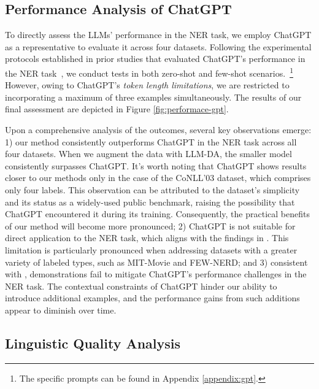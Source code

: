 \documentclass[11pt]{article}
\begin{document}
\subsection{Performance Analysis of ChatGPT}

To directly assess the LLMs' performance in the NER task, we employ ChatGPT as a representative to evaluate it across four datasets. Following the experimental protocols established in prior studies that evaluated ChatGPT's performance in the NER task~\cite{Stanford,GPT-chen, GPT-ye}, we conduct tests in both zero-shot and few-shot scenarios.~\footnote{The specific prompts can be found in Appendix \ref{appendix:gpt}.} However, owing to ChatGPT's \emph{token length limitations}, we are restricted to incorporating a maximum of three examples simultaneously. The results of our final assessment are depicted in Figure \ref{fig:performace-gpt}.

Upon a comprehensive analysis of the outcomes, several key observations emerge:
1) our method consistently outperforms ChatGPT in the NER task across all four datasets. When we augment the data with LLM-DA, the smaller model consistently surpasses ChatGPT. It's worth noting that ChatGPT shows results closer to our methods only in the case of the CoNLL'03 dataset, which comprises only four labels. This observation can be attributed to the dataset's simplicity and its status as a widely-used public benchmark, raising the possibility that ChatGPT encountered it during its training. Consequently, the practical benefits of our method will become more pronounced;
2) ChatGPT is not suitable for direct application to the NER task, which aligns with the findings in \citet{GPT-ye}. This limitation is particularly pronounced when addressing datasets with a greater variety of labeled types, such as MIT-Movie and FEW-NERD;
and 3) consistent with \citet{in-context}, demonstrations fail to mitigate ChatGPT's performance challenges in the NER task. The contextual constraints of ChatGPT hinder our ability to introduce additional examples, and the performance gains from such additions appear to diminish over time.




\subsection{Linguistic Quality Analysis}
\end{document}
